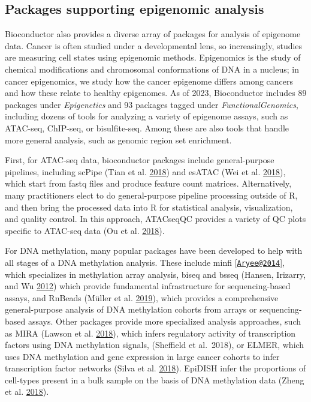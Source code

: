 \hypertarget{packages-supporting-epigenomic-analysis}{%
\subsection{Packages supporting epigenomic analysis}\label{packages-supporting-epigenomic-analysis}}

Bioconductor also provides a diverse array of packages for analysis of epigenome
data. Cancer is often studied under a developmental lens, so increasingly, studies
are measuring cell states using epigenomic methods. Epigenomics is the study of
chemical modifications and chromosomal conformations of DNA in a nucleus; in cancer
epigenomics, we study how the cancer epigenome differs among cancers and how
these relate to healthy epigenomes. As of 2023, Bioconductor includes 89 packages
under \emph{Epigenetics} and 93 packages tagged under \emph{FunctionalGenomics}, including dozens of tools
for analyzing a variety of epigenome assays, such as ATAC-seq, ChIP-seq, or
bisulfite-seq. Among these are also tools that handle more general analysis, such
as genomic region set enrichment.

First, for ATAC-seq data, bioconductor packages include general-purpose pipelines, including scPipe
(Tian et al. \protect\hyperlink{ref-Tian2018}{2018})
and esATAC (Wei et al. \protect\hyperlink{ref-Wei2018}{2018}), which start from fastq files and produce feature count
matrices. Alternatively, many practitioners elect to do general-purpose pipeline processing outside of
R, and then bring the processed data into R for statistical analysis,
visualization, and quality control. In this approach, ATACseqQC
provides
a variety of QC plots specific to ATAC-seq data (Ou et al. \protect\hyperlink{ref-Ou2018}{2018}).

For DNA methylation, many popular packages have been developed to help with
all stages of a DNA methylation analysis. These include minfi {[}\href{mailto:Aryee@2014}{\nolinkurl{Aryee@2014}}{]},
which specializes in methylation array analysis, biseq and bsseq (Hansen, Irizarry, and Wu \protect\hyperlink{ref-Hansen2012}{2012})
which provide fundamental infrastructure for sequencing-based assays, and RnBeads
(Müller et al. \protect\hyperlink{ref-Mueller2019}{2019}), which provides a comprehensive general-purpose analysis of DNA
methylation cohorts from arrays or sequencing-based assays. Other packages provide more specialized
analysis approaches, such as MIRA (Lawson et al. \protect\hyperlink{ref-Lawson2018}{2018}), which infers regulatory
activity of transcription factors using DNA methylation signals, (Sheffield et al.~2018),
or ELMER, which uses DNA methylation and gene expression in large cancer
cohorts to infer transcription factor networks (Silva et al. \protect\hyperlink{ref-Silva2019}{2018}). EpiDISH infer
the proportions of cell-types present in a bulk sample on the basis
of DNA methylation data (Zheng et al. \protect\hyperlink{ref-Zheng2018a}{2018}).

